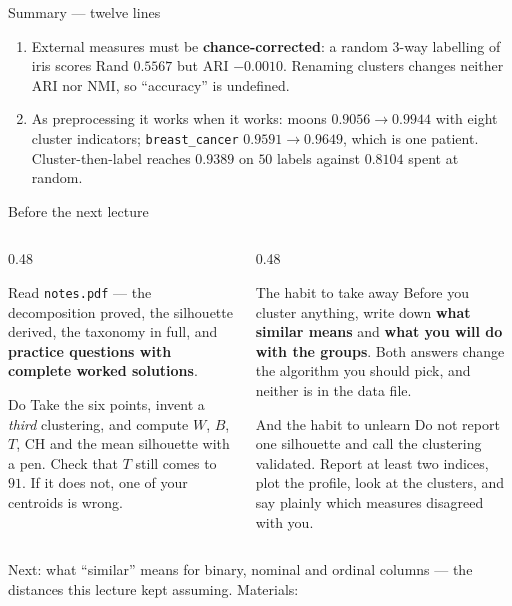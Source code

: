 \documentclass[aspectratio=169]{beamer}
\begin{document}
\begin{frame}[shrink=22]{Summary --- twelve lines}
\begin{enumerate}
      clustering is $\mathbf{-0.071164}$ --- negative means misassigned.
    \item External measures must be \textbf{chance-corrected}: a random
      3-way labelling of iris scores Rand $\mathbf{0.5567}$ but ARI
      $\mathbf{-0.0010}$. Renaming clusters changes neither ARI nor NMI, so
      ``accuracy'' is undefined.
    \item As preprocessing it works when it works: moons
      $0.9056 \to \mathbf{0.9944}$ with eight cluster indicators;
      \texttt{breast\_cancer} $0.9591 \to 0.9649$, which is one patient.
      Cluster-then-label reaches $\mathbf{0.9389}$ on $50$ labels against
      $0.8104$ spent at random.
  \end{enumerate}
\end{frame}

\begin{frame}[shrink=3]{Before the next lecture}
  \begin{columns}[T]
    \begin{column}{0.48\textwidth}
      \begin{block}{Read}
        \texttt{notes.pdf} --- the decomposition proved, the silhouette
        derived, the taxonomy in full, and \textbf{practice questions with
        complete worked solutions}.
      \end{block}
      \begin{block}{Do}
        Take the six points, invent a \emph{third} clustering, and compute
        $W$, $B$, $T$, CH and the mean silhouette with a pen. Check that $T$
        still comes to $91$. If it does not, one of your centroids is wrong.
      \end{block}
    \end{column}
    \begin{column}{0.48\textwidth}
      \begin{exampleblock}{The habit to take away}
        Before you cluster anything, write down \textbf{what similar means}
        and \textbf{what you will do with the groups}. Both answers change
        the algorithm you should pick, and neither is in the data file.
      \end{exampleblock}
      \begin{alertblock}{And the habit to unlearn}
        Do not report one silhouette and call the clustering validated.
        Report at least two indices, plot the profile, look at the clusters,
        and say plainly which measures disagreed with you.
      \end{alertblock}
    \end{column}
  \end{columns}
  \begin{center}
    \small Next: what ``similar'' means for binary, nominal and ordinal
    columns --- the distances this lecture kept assuming.
    \quad Materials: \texttt{\AMLRepoURL}
  \end{center}
  \slidesources{\AMLUnitVIISources}
\end{frame}
\end{document}
